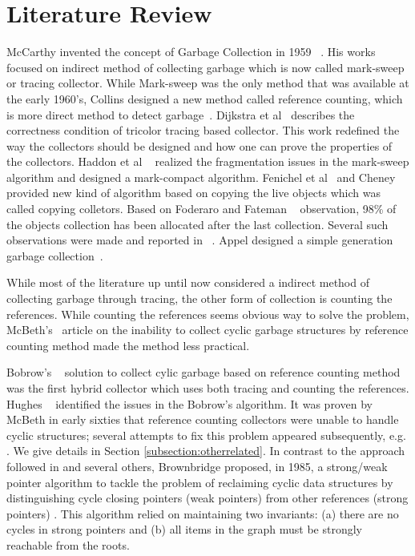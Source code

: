 \section{Literature Review}
McCarthy invented the concept of Garbage Collection in 1959 ~\cite{mccarthy}. His works focused on indirect method of collecting 
garbage which is now called mark-sweep or tracing collector. While Mark-sweep was the only method that was available at the early 1960's,
 Collins designed a new method called reference counting, which is more direct method to detect garbage~\cite{collins}. 
 Dijkstra et al~\cite{dijkstra} describes the correctness condition of tricolor tracing based collector. This work redefined the 
 way the collectors should be designed and how one can prove the properties of the collectors. Haddon et al ~\cite{haddon} realized 
 the fragmentation issues in the mark-sweep algorithm and designed a mark-compact algorithm. Fenichel et al~\cite{feni} and Cheney~\cite{cheney}
 provided new kind of algorithm based on copying the live objects which was called copying colletors. Based on Foderaro and Fateman ~\cite{fode81} observation, 
 98\% of the objects collection has been allocated after the last collection. Several such observations were made and reported in ~\cite{zorn89,sans93}.
 Appel designed a simple generation garbage collection~\cite{Appel89}.
 
 While most of the literature up until now considered a indirect method of collecting garbage through tracing, the other form of collection is counting the references.
 While counting the references seems obvious way to solve the problem, McBeth's~\cite{McBeth1983} article on the inability to collect cyclic garbage structures by 
 reference counting method made the method less practical.

Bobrow's ~\cite{Bobrow1980} solution to collect cylic garbage based on reference counting method was the first hybrid collector which uses both tracing and
counting the references. Hughes ~\cite{hugh83,hugh87} identified the issues in the Bobrow's algorithm.
It was proven by McBeth \cite{McBeth1963} in early sixties that reference counting collectors were unable to handle cyclic structures; several attempts to fix this problem appeared subsequently, e.g. \cite{Friedman1979,Bobrow1980,Lins2008}. We give details in Section \ref{subsection:otherrelated}.
In contrast to the approach followed in \cite{Friedman1979,Bobrow1980,Lins2008} and several others,
Brownbridge \cite{Brownbridge1985} proposed, in 1985, a strong/weak pointer algorithm to tackle the problem of reclaiming cyclic data structures by distinguishing cycle closing pointers (weak pointers) from other references (strong pointers) \cite{Jones1996}. %
This algorithm relied on maintaining two invariants: (a) there are no cycles in strong pointers and (b) all items in the graph must be strongly reachable from the roots.

